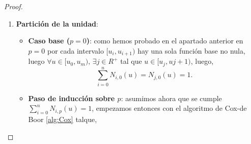 \documentclass[11pt]{book}
\theoremstyle{plain} %
\theoremstyle{definition} %
\theoremstyle{definition} %
\begin{document}
\begin{proof}
\begin{enumerate}
\begin{itemize}
                    Por la fórmula de recurrencia de Cox-de Boor, la función $N_{j,p}(u)$ es una combinación lineal de $N_{j,p-1}(u)$ y $N_{j+1,p-1}(u)$. Dado que los coeficientes de la combinación y las propias bases son no negativos en el dominio válido, $N_{j,p}(u)$ será estrictamente positiva en $[u_i, u_{i+1})$ si y solo si al menos una de las dos funciones de grado inferior es no nula en dicho intervalo. Evaluando los índices:
                    \begin{itemize}
                        \item $N_{j,p-1}(u) \neq 0 \implies j \in \{i-p+1, \dots, i\}$
                        \item $N_{j+1,p-1}(u) \neq 0 \implies j+1 \in \{i-p+1, \dots, i\} \implies j \in \{i-p, \dots, i-1\}$
                    \end{itemize}
                    La unión de ambos conjuntos de índices determina las funciones base de grado $p$ que son activas en el intervalo:
                    \begin{equation*}
                        j \in \{i-p+1, \dots, i\} \cup \{i-p, \dots, i-1\} = \{i-p, i-p+1, \dots, i\}
                    \end{equation*}
                    Este conjunto contiene exactamente $p+1$ índices distintos. Por lo tanto, en cualquier intervalo paramétrico no nulo existen exactamente $p+1$ funciones base activas, completando así la inducción.
                \end{itemize}
            \item \textbf{Partición de la unidad}:
                \begin{itemize}
                    \item \textbf{Caso base ($p=0$)}: como hemos probado en el apartado anterior en $p=0$ por cada intervalo $[u_i, u_{i+1})$ hay una sola función base no nula, luego $\forall u \in [u_0, u_m), \, \exists j\in R^+$ tal que $u\in [u_j,u{j+1})$, luego,
                    \begin{equation*}
                        \sum_{i=0}^{n} N_{i,0}(u) = N_{j,0}(u) = 1.
                    \end{equation*}
                    \item \textbf{Paso de inducción sobre $p$}: asumimos ahora que se cumple $\sum_{i=0}^{n} N_{i,p}(u)=1$, empezamos entonces con el algoritmo de Cox-de Boor \ref{alg:Cox} talque,

\end{itemize}
\end{enumerate}
\end{proof}
\end{document}
